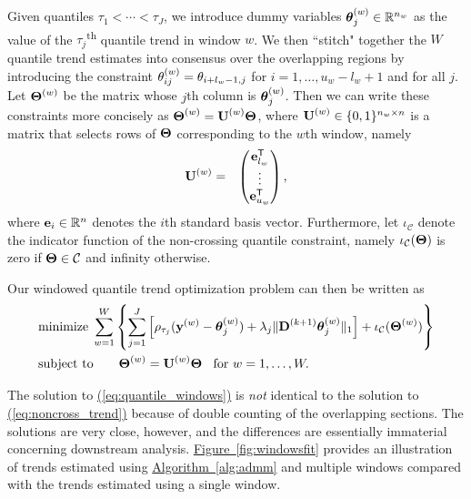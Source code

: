 \documentclass[aoas]{imsart}
\newcommand{\Eqn}[1]{\hyperref[eq:#1]{{\rm (\ref*{eq:#1})}}} %
\newcommand{\Fig}[1]{\hyperref[fig:#1]{Figure~\ref*{fig:#1}}} %
\newcommand{\Alg}[1]{\hyperref[alg:#1]{Algorithm~\ref*{alg:#1}}} %
\newcommand{\Eqn}[1]{{(\ref{eq:#1})}} %
\newcommand{\Fig}[1]{{Figure~\ref{fig:#1}}} %
\newcommand{\Alg}[1]{{Algorithm~\ref{alg:#1}}} %
\newcommand{\Real}{\mathbb{R}}
\newcommand{\Tra}{^{\sf T}} %
\newcommand{\V}[1]{{\bm{\mathbf{\MakeLowercase{#1}}}}} %
\newcommand{\VE}[2]{\MakeLowercase{#1}_{#2}} %
\newcommand{\Vn}[2]{\V{#1}^{(#2)}} %
\newcommand{\VnE}[3]{{#1}^{(#2)}_{#3}} %
\newcommand{\M}[1]{{\bm{\mathbf{\MakeUppercase{#1}}}}} %
\newcommand{\Mn}[2]{\M{#1}^{(#2)}} %
\begin{document}
 Given quantiles $\tau_1 < \cdots < \tau_J$, we introduce dummy variables $\Vn{\theta}{w}_{j} \in \Real^{n_w}$ as the value of the $\tau_j$\textsuperscript{th} quantile trend in window $w$. We then ``stitch" together the $W$ quantile trend estimates into consensus over the overlapping regions by introducing the constraint $\VnE{\theta}{w}{ij} = \VE{\theta}{i + l_w - 1,j}$ for $i = 1, \ldots, u_w - l_w + 1$ and for all $j$. Let $\Mn{\Theta}{w}$ be the matrix whose $j$th column is $\Vn{\theta}{w}_{j}$. Then we can write these constraints more concisely as $\Mn{\Theta}{w} = \Mn{U}{w}\M{\Theta}$, where $\Mn{U}{w} \in \{0, 1\}^{n_w \times n}$ is a matrix that selects rows of $\M{\Theta}$ corresponding to the $w$th window, namely
 \begin{eqnarray*}
 	\Mn{U}{w} & = & \begin{pmatrix}
 		\V{e}_{l_w}\Tra \\
 		\vdots \\
 		\V{e}_{u_w}\Tra
 	\end{pmatrix},
 \end{eqnarray*}
 where $\V{e}_i \in \Real^{n}$ denotes the $i$th standard basis vector. Furthermore, let $\iota_{\mathcal{C}}$ denote the indicator function of the non-crossing quantile constraint, namely $\iota_{\mathcal{C}}(\M{\Theta})$ is zero if $\M{\Theta} \in \mathcal{C}$ and infinity otherwise.
 
 Our windowed quantile trend optimization problem can then be written as
 \begin{equation}
 \label{eq:quantile_windows}
 \begin{split}
 &\text{minimize}\; \sum_{w=1}^W \left \{\sum_{j=1}^J \left [\rho_{\tau_j}(\Vn{y}{w} - \Vn{\theta}{w}_{j}) +
 \lambda_j \lVert \Mn{D}{k+1} \Vn{\theta}{w}_{j} \rVert_1 \right ] + \iota_\mathcal{C}(\Mn{\Theta}{w}) \right\}\\
 &\text{subject to} \qquad \Mn{\Theta}{w} = \Mn{U}{w}\M{\Theta} \;\; \text{ for } w = 1, \ldots, W.
 \end{split}
 \end{equation}
  
 The solution to \Eqn{quantile_windows} is {\em not} identical to the solution to \Eqn{noncross_trend} because of double counting of the overlapping sections. The solutions are very close, however, and the differences are essentially immaterial concerning downstream analysis. \Fig{windowsfit} provides an illustration of trends estimated using \Alg{admm} and multiple windows compared with the trends estimated using a single window. 
 
\end{document}
